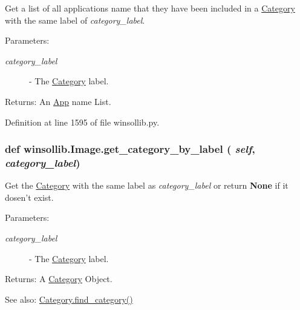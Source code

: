 Get a list of all applications name that they have been included in a \hyperlink{classwinsollib_1_1Category}{Category} with the same label of {\em category\_\-label\/}. 

\begin{Desc}
\item[Parameters:]
\begin{description}
\item[{\em category\_\-label}]- The \hyperlink{classwinsollib_1_1Category}{Category} label. \end{description}
\end{Desc}
\begin{Desc}
\item[Returns:]An \hyperlink{classwinsollib_1_1App}{App} name List. \end{Desc}


Definition at line 1595 of file winsollib.py.\hypertarget{classwinsollib_1_1Image_b6f7508c0bd78f4a8d08bb7d9f4d49f8}{
\subsubsection[get\_\-category\_\-by\_\-label]{\setlength{\rightskip}{0pt plus 5cm}def winsollib.Image.get\_\-category\_\-by\_\-label ( {\em self},  {\em category\_\-label})}}
\label{classwinsollib_1_1Image_b6f7508c0bd78f4a8d08bb7d9f4d49f8}


Get the \hyperlink{classwinsollib_1_1Category}{Category} with the same label as {\em category\_\-label\/} or return {\bf None} if it dosen't exist. 

\begin{Desc}
\item[Parameters:]
\begin{description}
\item[{\em category\_\-label}]- The \hyperlink{classwinsollib_1_1Category}{Category} label. \end{description}
\end{Desc}
\begin{Desc}
\item[Returns:]A \hyperlink{classwinsollib_1_1Category}{Category} Object.\end{Desc}
\begin{Desc}
\item[See also:]\hyperlink{classwinsollib_1_1Category_ced2fd769fd79d564f6b5fc588797d2d}{Category.find\_\-category()} \end{Desc}


